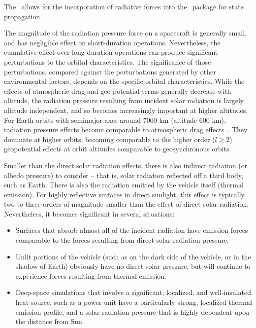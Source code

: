 %
%
%



The \RadiationPressureDesc\ allows for the incorporation of radiative forces
into the \JEODid\ package for state propagation.

The magnitude of the radiation pressure force on a spacecraft is generally
small, and has negligible effect on short-duration operations.  Nevertheless,
the cumulative effect over long-duration operations can produce significant
perturbations to the orbital characteristics.  The significance of those
perturbations, compared against the perturbations generated by other environmental factors, depends on the specific orbital characteristics.
While the effects of atmospheric drag and
geo-potential terms generally decrease with altitude, the radiation pressure resulting from incident solar
radiation is largely altitude independent, and so becomes increasingly
important at higher altitudes.
For Earth orbits with
semimajor axes around 7000 km (altitude 600 km), radiation pressure effects
become comparable to atmospheric drag effects~\cite{radbib:Milani}.  They dominate
at higher orbits, becoming comparable to the higher order
(\textit{$ l {\geq} 2 $}) geopotential effects at orbit altitudes comparable
to geosynchronous orbits.

Smaller than the direct solar radiation effects, there is also indirect
radiation (or albedo pressure) to consider -- that is, solar radiation reflected
off a third body, such as Earth.
There is also the radiation emitted by the vehicle itself (thermal emission).
For highly reflective surfaces in direct sunlight, this effect is typically two to three orders of magnitude smaller than the effect of
direct solar radiation.  Nevertheless, it becomes significant in several situations:

\begin{itemize}
\item Surfaces that absorb almost all of the incident
radiation have emission forces comparable to the forces resulting from direct solar radiation pressure.
\item Unlit portions of the vehicle (such as on the dark side of the vehicle,
or in the shadow of Earth) obviously have no direct solar pressure, but will continue to experience forces resulting from thermal emission.
\item Deep-space simulations that involve a significant, localized, and
well-insulated heat source, such as a power unit have a particularly strong, localized thermal emission profile, and a solar radiation pressure that is highly dependent upon the distance from Sun.
\end{itemize}

